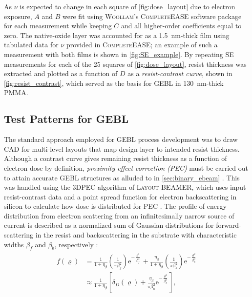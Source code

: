 As $\nu$ is expected to change in each square of \cref{fig:dose_layout} due to electron exposure, $A$ and $B$ were fit using \textsc{Woollam}'s \textsc{CompleteEASE} software package \cite{complete_ease} for each measurement while keeping $C$ and all higher-order coefficients equal to zero. 
The native-oxide layer was accounted for as a \SI{1.5}{\nm}-thick film using tabulated data for $\nu$ provided in \textsc{CompleteEASE}; an example of such a measurement with both films is shown in \cref{fig:SE_example}. 
By repeating SE measurements for each of the \num{25} squares of \cref{fig:dose_layout}, resist thickness was extracted and plotted as a function of $D$ as a \emph{resist-contrast curve}, shown in \cref{fig:resist_contrast}, which served as the basis for GEBL in \SI{130}{\nm}-thick PMMA. 

\subsection[Test Patterns for Grayscale Electron-Beam Lithography]{Test Patterns for GEBL}\label{sec:GEBL}
The standard approach employed for GEBL process development was to draw CAD for multi-level layouts that map design layer to intended resist thickness. 
Although a contrast curve gives remaining resist thickness as a function of electron dose by definition, \emph{proximity effect correction (PEC)} must be carried out to attain accurate GEBL structures as alluded to in \cref{sec:binary_ebeam} \cite{Pavkovich86}. 
This was handled using the \textsc{3DPEC} algorithm of \textsc{Layout BEAMER}, which uses input resist-contrast data and a point spread function for electron backscattering in silicon to calculate how dose is distributed for PEC \cite{beamer,Unal10}. %
The profile of energy distribution from electron scattering from an infinitesimally narrow source of current is described as a normalized sum of Gaussian distributions for forward-scattering in the resist and backscattering in the substrate with characteristic widths $\beta_f$ and $\beta_b$, respectively \cite{Pavkovich86}: 
\begin{align}
 \begin{split}
 f(\varrho) &= \frac{1}{1 + \eta_{\beta}} \left( \frac{1}{\pi \beta_f^2} \right) \mathrm{e}^{- \frac{\varrho^2}{\beta_f^2}} + \frac{\eta_{\beta}}{1 + \eta_{\beta}} \left( \frac{1}{\pi \beta_b^2} \right) \mathrm{e}^{- \frac{\varrho^2}{\beta_b^2}} \\
 &\approx \frac{1}{1 + \eta_{\beta}}  \left[ \delta_D (\varrho) + \frac{\eta_{\beta}}{\pi \beta_b^2} \mathrm{e}^{- \frac{\varrho^2}{\beta_b^2} } \right] ,
 \end{split}
 \end{align}
